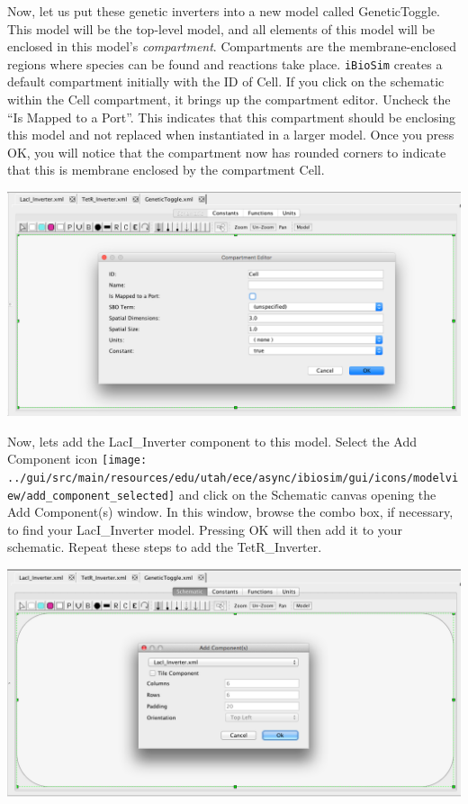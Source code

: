 \documentclass[titlepage,11pt]{article}
\begin{document}
Now, let us put these genetic inverters into a new model called GeneticToggle.
This model will be the top-level model, and all elements of this model will be enclosed in this model's \emph{compartment}.  Compartments are the membrane-enclosed regions where species can be found and reactions take place.  {\tt iBioSim} creates a default compartment initially with the ID of Cell.  If you click on the schematic within the Cell compartment, it brings up the compartment editor.  Uncheck the ``Is Mapped to a Port''.  This indicates that this compartment should be enclosing this model and not replaced when instantiated in a larger model.  Once you press OK, you will notice that the compartment now has rounded corners to indicate that this is membrane enclosed by the compartment Cell.

\begin{center}
\includegraphics[width=160mm]{screenshots/compartmentGT}
\end{center}

Now, lets add the LacI\_Inverter component to this model.  Select the Add Component icon \texttt{[image: ../gui/src/main/resources/edu/utah/ece/async/ibiosim/gui/icons/modelview/add\_component\_selected]} and click on the Schematic canvas opening the Add Component(s) window.  In this window, browse the combo box, if necessary, to find your LacI\_Inverter model.  Pressing OK will then add it to your schematic.  Repeat these steps to add the TetR\_Inverter.

\begin{center}
\includegraphics[width=160mm]{screenshots/subModelGT}
\end{center}
\end{document}
